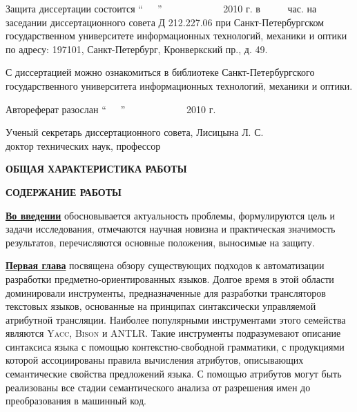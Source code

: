 \documentclass[12pt,a4paper]{article}
\makeatletter
\newcommand{\tool}[1]{\textsc{#1}}
\theoremstyle{definition}
\theoremstyle{plain}
\renewcommand{\@oddhead}{\hfill{\large \thepage}\hfill}
\renewcommand{\@oddfoot}{}
\renewcommand{\@evenhead}{\hfill{\large \thepage}\hfill}
\renewcommand{\@evenfoot}{}
\newcommand{\afsection}[1]{\par \begin{center}\textbf{\MakeUppercase{#1}}\end{center}}
\newcommand{\afsubsection}[1]{\par \underline{\textbf{#1}}}
\makeatother
\begin{document}
\vspace*{\fill}

\noindent
Защита диссертации состоится ``\ \ \ '' \hspace{1mm} \ \ \ \ \ \ \ \ \ \ \ \ 
2010 г. в \ \ \ \ \  час.  на заседании диссертационного совета 
Д 212.227.06 
при Санкт-Петербургском государственном университете информационных технологий, механики и оптики 
по адресу: 197101, Санкт-Петербург, Кронверкский пр., д. 49.


\vspace{1cm}

\noindent
С диссертацией можно ознакомиться в библиотеке
Санкт-Петербургского государственного университета информационных технологий, механики и оптики.


\vspace{1cm}

\noindent
Автореферат разослан \hspace{2mm}``\ \ \ '' \hspace{1mm}
\ \ \ \ \ \ \ \ \ \ \ \  2010 г.


\vspace*{\fill}
\noindent Ученый секретарь
диссертационного совета, \hspace*{\fill}Лисицына Л. С.\\
доктор технических наук, профессор




\setlength{\topmargin}{-5mm} \makeatletter
\renewcommand{\@oddhead}{\hfill{\large \thepage}\hfill}
\renewcommand{\@oddfoot}{}
\renewcommand{\@evenhead}{\hfill{\large \thepage}\hfill}
\renewcommand{\@evenfoot}{}
\makeatother

\newpage
\afsection{Общая характеристика работы}



\newpage
\afsection{Содержание работы}

\afsubsection{Во введении} обосновывается актуальность проблемы, формулируются цель и задачи исследования, отмечаются научная новизна и практическая значимость результатов, перечисляются основные положения, выносимые на защиту.

\afsubsection{Первая глава} посвящена обзору существующих подходов к автоматизации разработки предметно-ориентированных языков. Долгое время в этой области доминировали инструменты, предназначенные для разработки трансляторов текстовых языков, основанные на принципах синтаксически управляемой атрибутной трансляции. Наиболее популярными инструментами этого семейства являются \tool{Yacc}, \tool{Bison} и \tool{ANTLR}. Такие инструменты подразумевают описание синтаксиса языка с помощью контекстно-свободной грамматики, с продукциями которой ассоциированы правила вычисления атрибутов, описывающих семантические свойства предложений языка. С помощью атрибутов могут быть реализованы все стадии семантического анализа от разрешения имен до преобразования в машинный код. 
\end{document}
